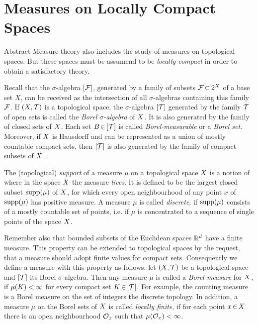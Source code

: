 \documentclass[11pt,twoside]{article}
\begin{document}
\newpage
\thispagestyle{empty}
\part{Measures on Locally Compact Spaces}                                      %
Abstract Measure theory also includes the study of measures
on topological spaces.
But these spaces must be assumend
to be \textit{locally compact} in order to obtain a satisfactory theory.

\subparagraph{}
Recall that the $\sigma$-algebra $[\cal{F}]$,
generated by a family of subsets $\cal{F} \xsubset 2^{X}$ of a base set $X$,
can be received as the intersection of all $\sigma$-algebras
containing this family $\cal{F}$.
If $(\topX,\topT)$ is a topological space,
the $\sigma$-algebra $[\topT]$ generated by the family $\topT$
of open sets is called the \textit{Borel $\sigma$-algebra} of $\topX$.
It is also generated by the family of closed sets of $\topX$.
Each set $B \xeof [\topT]$ is called \textit{Borel-measurable}
or a \textit{Borel set}.
Moreover,
if $\topX$ is Hausdorff and can be represented
as a union of mostly countable compact sets,
then $[\topT]$ is also generated by the family of compact subsets of $\topX$.

\subparagraph{}
The (topological) \textit{support} of a measure $\mu$ on a topological space
$\topX$ is a notion of where in the space $\topX$ the measure \textit{lives}.
It is defined to be the largest closed subset $\supp{\mu}$ of $\topX$,
for which every open neighbourhood of any point $x$ of $\supp{\mu}$
has positive measure.
A measure $\mu$ is called \textit{discrete},
if $\supp{\mu}$ consists of a mostly countable set of points,
i.e. if $\mu$ is concentrated to a sequence of single points
of the space $\topX$.

\subparagraph{}
Remember also
that bounded subsets of the Euclidean spaces $\Rd$ have a finite measure.
This property can be extended to topological spaces by the request,
that a measure should adopt finite values for compact sets.
Consequently we define a measure with this property as follows:
let $(\topX,\topT)$ be a topological space and $[\topT]$ its
Borel $\sigma$-algebra.
Then any measure $\mu$ is called a \textit{Borel measure} for $\topX$,
if $\mu(\compK) < \infty$ for every compact set $\compK \xeof [\topT]$.
For example,
the counting measure is a Borel measure on the set of integers
{\wrt} the discrete topology.
In addition,
a measure $\mu$ on the Borel sets of $\topX$
is called \textit{locally finite},
if for each point $x \xeof \topX$
there is an open neighbourhood $\openO_x$
such that $\mu(\openO_x) < \infty$.
\end{document}
